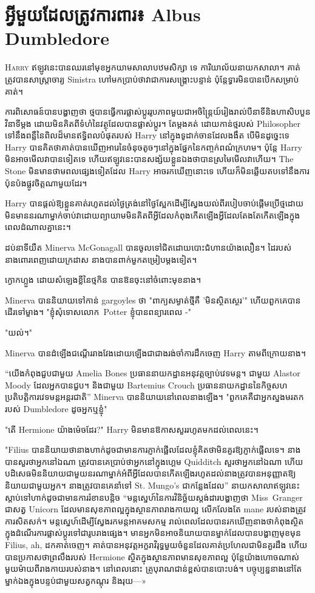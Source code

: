 \chapter{អ្វីមួយដែលត្រូវការពារ៖ Albus Dumbledore}

\lettrine{H}{arry} ឥឡូវ​នេះ​បាន​ឈរ​នៅ​មុខ​អ្នក​យាម​សាលា​បឋមសិក្សា ទេ ការិយាល័យ​នាយក​សាលា។ គាត់​ត្រូវ​បាន​សាស្ត្រាចារ្យ Sinistra ហៅ​មក​ប្រាប់​ថា​វា​ជា​ការ​សង្គ្រោះ​បន្ទាន់ ប៉ុន្តែ​ទ្វារ​មិន​បាន​បើក​សម្រាប់​គាត់។

ការ​ពិសោធន៍​បាន​បង្ហាញ​ថា ថ្ម​បាន​ធ្វើ​ការ​ផ្លាស់​ប្តូរ​រូប​ភាព​មួយ​ជា​អចិន្ត្រៃយ៍​រៀង​រាល់​បី​នាទី​និង​ហាសិប​បួន​វិនាទី​ម្តង ដោយ​មិន​គិត​ពី​ទំហំ​នៃ​វត្ថុ​ដែល​បាន​ផ្លាស់​ប្តូរ។ តែម្តងគត់ ដោយកាន់ថ្មរបស់ Philosopher ទៅនឹងពន្លឺនៃពិលដ៏មានឥទ្ធិពលបំផុតរបស់ Harry នៅក្នុងទូដាក់ចានដែលងងឹត បើមិនដូច្នេះទេ Harry បានគិតថាគាត់បានឃើញអារេនៃចំនុចតូចៗនៅក្នុងផ្នែកនៃកញ្ចក់ពណ៌ក្រហម។ ប៉ុន្តែ Harry មិន​អាច​មើល​វា​បាន​ទៀត​ទេ ហើយ​ឥឡូវ​នេះ​បាន​សង្ស័យ​ខ្លួន​ឯង​ថា​បាន​ស្រមៃ​មើល​វា​ហើយ។ The Stone មិនមានថាមពលផ្សេងទៀតដែល Harry អាចរកឃើញនោះទេ ហើយក៏មិនឆ្លើយតបទៅនឹងការប៉ុនប៉ងផ្លូវចិត្តណាមួយដែរ។

Harry បានផ្តល់ឱ្យខ្លួនគាត់រហូតដល់ថ្ងៃត្រង់នៅថ្ងៃស្អែកដើម្បីស្វែងយល់ពីរបៀបចាប់ផ្តើមប្រើថ្មដោយមិនមាននរណាម្នាក់ចាប់វាដោយព្យាយាមមិនគិតពីអ្វីដែលកំពុងកើតឡើងអ្វីដែលតែងតែកើតឡើងក្នុងពេលដំណាលគ្នានេះ។

ដប់នាទីយឺត Minerva McGonagall បានចូលទៅជិតដោយបោះជំហានយ៉ាងលឿន។ ដៃរបស់នាងពោរពេញដោយក្រដាស នាងបានពាក់មួកតម្រៀបម្តងទៀត។

ក្ងោកហ្លួង ដោយសំឡេងខ្លីនៃថ្មកិន បានឱនចុះនៅចំពោះមុខនាង។

Minerva បាននិយាយទៅកាន់ gargoyles ថា "ពាក្យសម្ងាត់ថ្មីគឺ 'មិនស្ថិតស្ថេរ'" ហើយពួកគេបានដើរទៅម្ខាង។ "ខ្ញុំសុំទោសលោក~Potter ខ្ញុំបានពន្យារពេល -"

"យល់។"

Minerva បាន​ដំឡើង​ជណ្តើរ​រាង​វែង​ដោយ​ឡើង​ជា​ជាង​រង់ចាំ​ការ​ដឹក​ចេញ Harry តាម​ពី​ក្រោយ​នាង។

“យើងកំពុងជួបជាមួយ Amelia Bones ប្រធាននាយកដ្ឋានអនុវត្តច្បាប់វេទមន្ត។ ជាមួយ Alastor Moody ដែលអ្នកបានជួប។ និងជាមួយ Bartemius Crouch ប្រធាននាយកដ្ឋាននៃកិច្ចសហប្រតិបត្តិការវេទមន្តអន្តរជាតិ” Minerva បាននិយាយនៅពេលនាងឡើង។ "ពួកគេគឺជាអ្នកស្នងមរតករបស់ Dumbledore ដូចអ្នកឬខ្ញុំ"

"តើ Hermione យ៉ាងម៉េចដែរ?" Harry មិនមានឱកាសសួររហូតមកដល់ពេលនេះ។

"Filius បាននិយាយថានាងហាក់ដូចជាមានការភ្ញាក់ផ្អើលដែលខ្ញុំគិតថាមិនគួរឱ្យភ្ញាក់ផ្អើលទេ។ នាងបានសួរថាអ្នកនៅឯណា ត្រូវបានគេប្រាប់ថាអ្នកនៅក្នុងហ្គេម Quidditch សួរថាអ្នកនៅឯណា ហើយបដិសេធមិននិយាយជាមួយនរណាម្នាក់អំពីអ្វីដែលបានកើតឡើងរហូតដល់នាងត្រូវបានអនុញ្ញាតឱ្យនិយាយជាមួយអ្នក។ នាងត្រូវបានគេនាំទៅ St. Mungo's ជាកន្លែងដែល” នាយកសាលាឥឡូវនេះស្តាប់ទៅហាក់ដូចជាមានការរំខានបន្តិច “មន្តស្នេហ៍នៃការវិនិច្ឆ័យស្តង់ដារបង្ហាញថា Miss~Granger ជាសត្វ Unicorn ដែលមានសុខភាពល្អក្នុងស្ថានភាពរាងកាយល្អ លើកលែងតែ mane របស់នាងត្រូវការសិតសក់។ មន្តស្នេហ៍ដើម្បីស្វែងរកមន្តអាគមសកម្ម រាល់ពេលដែលបានរកឃើញនាងថាកំពុងស្ថិតក្នុងដំណើរការផ្លាស់ប្តូរទៅជារូបរាងផ្សេង។ មាន​អ្នក​មិន​អាច​និយាយ​បាន​ម្នាក់​ដែល​បាន​បង្ហាញ​មុខ​មុន Filius, ah, ដក​គាត់​ចេញ។ គាត់បានអនុវត្តអក្ខរាវិរុទ្ធមួយចំនួនដែលគាត់ប្រហែលជាមិនគួរដឹង ហើយបានប្រកាសថាព្រលឹងរបស់ Hermione ស្ថិតក្នុងស្ថានភាពមានសុខភាពល្អ ប៉ុន្តែយ៉ាងហោចណាស់មួយម៉ាយពីរាងកាយរបស់នាង។ នៅពេលនោះ គ្រូបុរាណជាន់ខ្ពស់បានបោះបង់។ បច្ចុប្បន្ន​នាង​នៅ​តែ​ម្នាក់​ឯង​ក្នុង​បន្ទប់​ជាមួយ​សត្វ​កណ្ដុរ និង​រុយ—»


